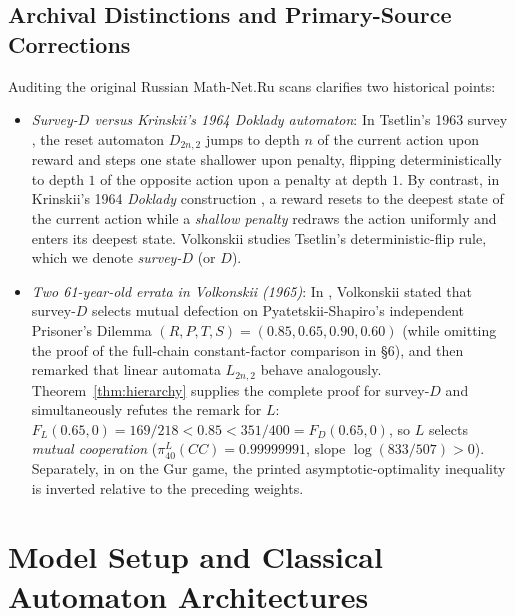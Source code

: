 \documentclass[11pt,reqno]{amsart}
\theoremstyle{definition}
\theoremstyle{remark}
\begin{document}
\subsection{Archival Distinctions and Primary-Source Corrections}
Auditing the original Russian Math-Net.Ru scans clarifies two historical points:
\begin{itemize}
  \item \emph{Survey-$D$ versus Krinskii's 1964 Doklady automaton}: In Tsetlin's 1963 survey \cite[\S 2, pp.~11--13]{Tsetlin1963}, the reset automaton $D_{2n,2}$ jumps to depth $n$ of the current action upon reward and steps one state shallower upon penalty, flipping deterministically to depth $1$ of the opposite action upon a penalty at depth $1$. By contrast, in Krinskii's 1964 \emph{Doklady} construction \cite[p.~1312]{Krinskii1964}, a reward resets to the deepest state of the current action while a \emph{shallow penalty} redraws the action uniformly and enters its deepest state. Volkonskii \cite{Volkonskii1965} studies Tsetlin's deterministic-flip rule, which we denote \emph{survey-$D$} (or $D$).
  \item \emph{Two 61-year-old errata in Volkonskii (1965)}: In \cite[pp.~46--47]{Volkonskii1965}, Volkonskii stated that survey-$D$ selects mutual defection on Pyatetskii-Shapiro's independent Prisoner's Dilemma $(R,P,T,S) = (0.85, 0.65, 0.90, 0.60)$ (while omitting the proof of the full-chain constant-factor comparison in \S 6), and then remarked that linear automata $L_{2n,2}$ behave analogously. Theorem~\ref{thm:hierarchy} supplies the complete proof for survey-$D$ and simultaneously refutes the remark for $L$: $F_L(0.65,0) = 169/218 < 0.85 < 351/400 = F_D(0.65,0)$, so $L$ selects \emph{mutual cooperation} ($\pi_{40}^L(CC) = 0.99999991$, slope $\log(833/507) > 0$). Separately, in \cite[\S 7, p.~48]{Volkonskii1965} on the Gur game, the printed asymptotic-optimality inequality is inverted relative to the preceding weights.
\end{itemize}

\section{Model Setup and Classical Automaton Architectures}
\end{document}
